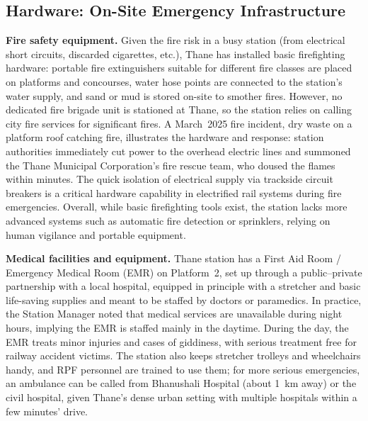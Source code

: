 \documentclass[11pt]{article}
\begin{document}
\subsection{Hardware: On-Site Emergency Infrastructure}

\textbf{Fire safety equipment.} Given the fire risk in a busy station (from electrical short
circuits, discarded cigarettes, etc.), Thane has installed basic firefighting hardware: portable
fire extinguishers suitable for different fire classes are placed on platforms and concourses,
water hose points are connected to the station's water supply, and sand or mud is stored on-site
to smother fires. However, no dedicated fire brigade unit is stationed at Thane, so the station
relies on calling city fire services for significant fires. A March~2025 fire incident, dry
waste on a platform roof catching fire, illustrates the hardware and response: station
authorities immediately cut power to the overhead electric lines and summoned the Thane
Municipal Corporation's fire rescue team, who doused the flames within minutes. The quick
isolation of electrical supply via trackside circuit breakers is a critical hardware capability
in electrified rail systems during fire emergencies. Overall, while basic firefighting tools
exist, the station lacks more advanced systems such as automatic fire detection or sprinklers,
relying on human vigilance and portable equipment.

\textbf{Medical facilities and equipment.} Thane station has a First Aid Room / Emergency
Medical Room (EMR) on Platform~2, set up through a public--private partnership with a local
hospital, equipped in principle with a stretcher and basic life-saving supplies and meant to be
staffed by doctors or paramedics. In practice, the Station Manager noted that medical services
are unavailable during night hours, implying the EMR is staffed mainly in the daytime. During
the day, the EMR treats minor injuries and cases of giddiness, with serious treatment free for
railway accident victims. The station also keeps stretcher trolleys and wheelchairs handy, and
RPF personnel are trained to use them; for more serious emergencies, an ambulance can be called
from Bhanushali Hospital (about 1~km away) or the civil hospital, given Thane's dense urban
setting with multiple hospitals within a few minutes' drive.
\end{document}
